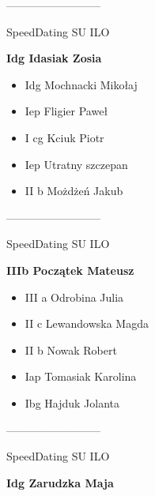 \documentclass[a4paper,10pt]{article}
\begin{document}
\begin{multicols}{3}
\begin{minipage}[l]{\textwidth}
\begin{itemize}
    \end{itemize}



\end{minipage}



\begin{minipage}[l]{\textwidth}
--------------------------

  \footnotesize{SpeedDating SU ILO}

  \bfseries{Idg Idasiak Zosia}

  \begin{itemize}
    \item Idg Mochnacki Mikołaj
    \item Iep Fligier Paweł
    \item I cg Kciuk Piotr
    \item Iep Utratny szczepan
    \item II b Możdżeń Jakub

    \end{itemize}



\end{minipage}



\begin{minipage}[l]{\textwidth}
--------------------------

  \footnotesize{SpeedDating SU ILO}

  \bfseries{IIIb Początek Mateusz}

  \begin{itemize}
    \item III a Odrobina Julia
    \item II c Lewandowska Magda
    \item II b Nowak Robert
    \item Iap Tomasiak Karolina
    \item Ibg Hajduk Jolanta

    \end{itemize}



\end{minipage}



\begin{minipage}[l]{\textwidth}
--------------------------

  \footnotesize{SpeedDating SU ILO}

  \bfseries{Idg Zarudzka Maja}


\end{minipage}
\end{multicols}
\end{document}
